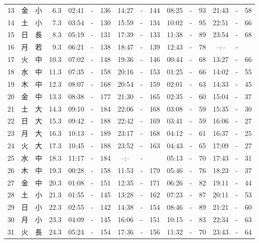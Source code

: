 \documentclass[12pt.a4j]{jsarticle}
\begin{document}
\begin{center}
\begin{table}[ht]
\begin{tabular}{|rc|cr|ccrccr|ccrccr|}
13 & 金 & 小 &  6.3 &  02:41 &-& 136  &  14:27 &-& 144  &   08:25 &-&  93  &   21:43 &-&  58  \\
14 & 土 & 小 &  7.3 &  03:54 &-& 130  &  15:59 &-& 134  &   10:02 &-&  95  &   22:51 &-&  66  \\
15 & 日 & 長 &  8.3 &  05:19 &-& 131  &  17:39 &-& 133  &   11:38 &-&  89  &   23:54 &-&  68  \\
16 & 月 & 若 &  9.3 &  06:21 &-& 138  &  18:47 &-& 139  &   12:43 &-&  78  &   --:-- &-&     \\
17 & 火 & 中 & 10.3 &  07:02 &-& 148  &  19:36 &-& 146  &   00:44 &-&  68  &   13:27 &-&  66  \\
18 & 水 & 中 & 11.3 &  07:35 &-& 158  &  20:16 &-& 153  &   01:25 &-&  66  &   14:02 &-&  55  \\
19 & 木 & 中 & 12.3 &  08:07 &-& 168  &  20:54 &-& 159  &   02:01 &-&  63  &   14:33 &-&  45  \\
20 & 金 & 中 & 13.3 &  08:38 &-& 177  &  21:30 &-& 165  &   02:35 &-&  60  &   15:04 &-&  37  \\
21 & 土 & 大 & 14.3 &  09:10 &-& 184  &  22:06 &-& 168  &   03:08 &-&  59  &   15:35 &-&  30  \\
22 & 日 & 大 & 15.3 &  09:42 &-& 188  &  22:42 &-& 169  &   03:41 &-&  59  &   16:06 &-&  27  \\
23 & 月 & 大 & 16.3 &  10:13 &-& 189  &  23:17 &-& 168  &   04:12 &-&  61  &   16:37 &-&  25  \\
24 & 火 & 大 & 17.3 &  10:45 &-& 188  &  23:52 &-& 163  &   04:43 &-&  65  &   17:09 &-&  27  \\
25 & 水 & 中 & 18.3 &  11:17 &-& 184  &  --:-- &-&     &   05:13 &-&  70  &   17:43 &-&  31  \\
26 & 木 & 中 & 19.3 &  00:28 &-& 158  &  11:53 &-& 179  &   05:46 &-&  76  &   18:23 &-&  37  \\
27 & 金 & 中 & 20.3 &  01:08 &-& 151  &  12:35 &-& 171  &   06:26 &-&  82  &   19:11 &-&  44  \\
28 & 土 & 小 & 21.3 &  01:55 &-& 145  &  13:28 &-& 162  &   07:23 &-&  87  &   20:11 &-&  53  \\
29 & 日 & 小 & 22.3 &  02:55 &-& 142  &  14:38 &-& 154  &   08:46 &-&  89  &   21:21 &-&  60  \\
30 & 月 & 小 & 23.3 &  04:09 &-& 145  &  16:06 &-& 151  &   10:15 &-&  83  &   22:34 &-&  63  \\
31 & 火 & 長 & 24.3 &  05:24 &-& 154  &  17:36 &-& 156  &   11:32 &-&  70  &   23:43 &-&  64  \\

\end{tabular}
\end{table}
\end{center}
\end{document}
